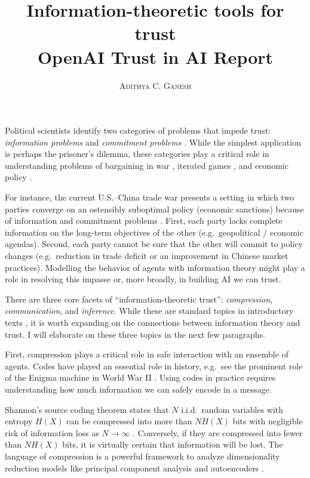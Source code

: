 \documentclass[11pt]{article}
\title{Information-theoretic tools for trust \\ \vspace{0.3cm} OpenAI Trust in AI Report}
\author{\textsc{Adithya C. Ganesh}}
\begin{document}
Political scientists identify two categories of problems that impede trust: {\it information problems} and {\it commitment problems} \cite{frieden2010world}.  While the simplest application is perhaps the prisoner's dilemma, these categories play a critical role in understanding problems of bargaining in war \cite{lake2010two}, iterated games \cite{axelrod1981evolution}, and economic policy \cite{panagariya2003international}.

For instance, the current U.S.--China trade war presents a setting in which two parties converge on an ostensibly suboptimal policy (economic sanctions) because of information and commitment problems \cite{liu2018understanding}\cite{amiti2019impact}\cite{li2018economic}.  First, each party lacks complete information on the long-term objectives of the other (e.g.\ geopolitical / economic agendas).  Second, each party cannot be sure that the other will commit to policy changes (e.g.\ reduction in trade deficit or an improvement in Chinese market practices).  Modelling the behavior of agents with information theory might play a role in resolving this impasse or, more broadly, in building AI we can trust. 

There are three core facets of ``information-theoretic trust'': {\it compression}, {\it communication}, and {\it inference}.  While these are standard topics in introductory texts \cite{cover2012elements}\cite{mackay2003information}, it is worth expanding on the connections between information theory and trust.  I will elaborate on these three topics in the next few paragraphs.

First, compression plays a critical role in safe interaction with an ensemble of agents.  Codes have played an essential role in history, e.g.\ see the prominent role of the Enigma machine in World War II \cite{booss2003mathematics}.  Using codes in practice requires understanding how much information we can safely encode in a message.

Shannon's source coding theorem states that $N$ i.i.d.\ random variables with entropy $H(X)$ can be compressed into more than $N H(X)$ bits with negligible risk of information loss as $N \to \infty$ \cite{shannon1948mathematical}\cite{mackay2003information}.  Conversely, if they are compressed into fewer than $N H(X)$ bits, it is virtually certain that information will be lost.  The language of compression is a powerful framework to analyze dimensionality reduction models like principal component analysis \cite{geiger2012relative} and autoencoders \cite{doersch2016tutorial}.
\end{document}
